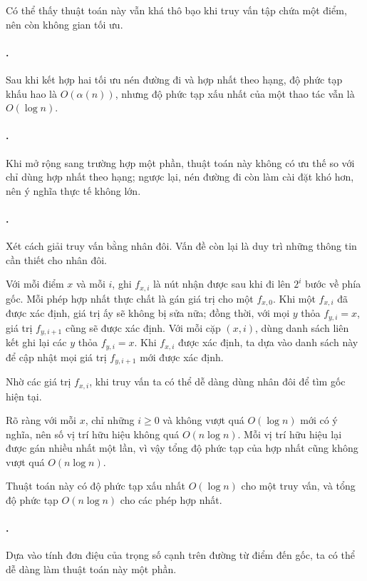 \documentclass[11pt]{article}
\begin{document}
Có thể thấy thuật toán này vẫn khá thô bạo khi truy vấn tập chứa một điểm, nên
còn không gian tối ưu.

\paragraph{.}
Sau khi kết hợp hai tối ưu nén đường đi và hợp nhất theo hạng, độ phức tạp
khấu hao là \(O(\alpha(n))\), nhưng độ phức tạp xấu nhất của một thao tác vẫn
là \(O(\log n)\).

\paragraph{.}
Khi mở rộng sang trường hợp  một phần, thuật toán này không
có ưu thế so với chỉ dùng hợp nhất theo hạng; ngược lại, nén đường đi còn làm
cài đặt khó hơn, nên ý nghĩa thực tế không lớn.

\paragraph{.}
Xét cách giải truy vấn bằng nhân đôi. Vấn đề còn lại là duy trì những thông
tin cần thiết cho nhân đôi.

Với mỗi điểm \(x\) và mỗi \(i\), ghi \(f_{x,i}\) là nút nhận được sau khi đi
lên \(2^i\) bước về phía gốc. Mỗi phép hợp nhất thực chất là gán giá trị cho
một \(f_{x,0}\). Khi một \(f_{x,i}\) đã được xác định, giá trị ấy sẽ không bị
sửa nữa; đồng thời, với mọi \(y\) thỏa \(f_{y,i}=x\), giá trị \(f_{y,i+1}\)
cũng sẽ được xác định. Với mỗi cặp \((x,i)\), dùng danh sách liên kết ghi lại
các \(y\) thỏa \(f_{y,i}=x\). Khi \(f_{x,i}\) được xác định, ta dựa vào danh
sách này để cập nhật mọi giá trị \(f_{y,i+1}\) mới được xác định.

Nhờ các giá trị \(f_{x,i}\), khi truy vấn ta có thể dễ dàng dùng nhân đôi để
tìm gốc hiện tại.

Rõ ràng với mỗi \(x\), chỉ những \(i\ge 0\) và không vượt quá \(O(\log n)\)
mới có ý nghĩa, nên số vị trí hữu hiệu không quá \(O(n\log n)\). Mỗi vị trí
hữu hiệu lại được gán nhiều nhất một lần, vì vậy tổng độ phức tạp của hợp nhất
cũng không vượt quá \(O(n\log n)\).

Thuật toán này có độ phức tạp xấu nhất \(O(\log n)\) cho một truy vấn, và
tổng độ phức tạp \(O(n\log n)\) cho các phép hợp nhất.

\paragraph{.}
Dựa vào tính đơn điệu của trọng số cạnh trên đường từ điểm đến gốc, ta có thể
dễ dàng làm thuật toán này  một phần.
\end{document}
